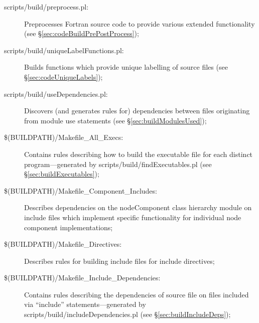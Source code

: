 \begin{description}
\item[{\normalfont \ttfamily scripts/build/preprocess.pl}:] Preprocesses Fortran source code to provide various extended functionality (see \S\ref{sec:codeBuildPrePostProcess});

\item[{\normalfont \ttfamily scripts/build/uniqueLabelFunctions.pl}:] Builds functions which provide unique labelling of source files (see \S\ref{sec:codeUniqueLabels});

\item[{\normalfont \ttfamily scripts/build/useDependencies.pl}:] Discovers (and generates rules for) dependencies between files originating from module {\normalfont \ttfamily use} statements (see \S\ref{sec:buildModulesUsed});
  
\item[{\normalfont \ttfamily \$(BUILDPATH)/Makefile\_All\_Execs}:] Contains rules describing how to build the executable file for each distinct program---generated by {\normalfont \ttfamily scripts/build/findExecutables.pl} (see \S\ref{sec:buildExecutables});

\item[{\normalfont \ttfamily \$(BUILDPATH)/Makefile\_Component\_Includes}:] Describes dependencies on the {\normalfont \ttfamily nodeComponent} class hierarchy module on include files which implement specific functionality for individual node component implementations;
  
\item[{\normalfont \ttfamily \$(BUILDPATH)/Makefile\_Directives}:] Describes rules for building include files for {\normalfont \ttfamily include} directives;

\item[{\normalfont \ttfamily \$(BUILDPATH)/Makefile\_Include\_Dependencies}:] Contains rules describing the dependencies of source file on files included via ``{\normalfont \ttfamily include}'' statements---generated by {\normalfont \ttfamily scripts/build/includeDependencies.pl} (see \S\ref{sec:buildIncludeDeps});


\end{description}
